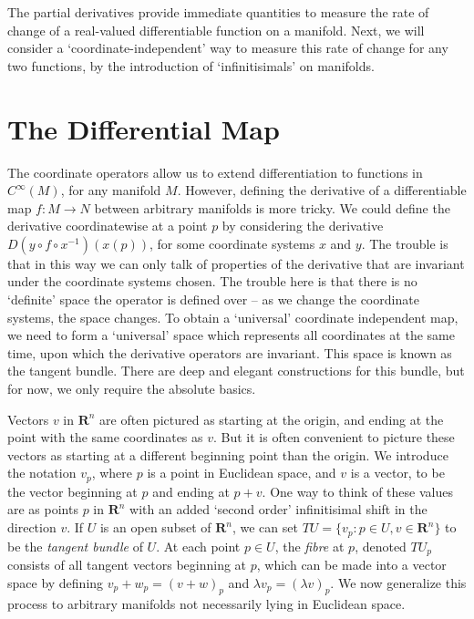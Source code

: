 The partial derivatives provide immediate quantities to measure the rate of change of a real-valued differentiable function on a manifold. Next, we will consider a `coordinate-independent' way to measure this rate of change for any two functions, by the introduction of `infinitisimals' on manifolds.

\section{The Differential Map}

The coordinate operators allow us to extend differentiation to functions in $C^\infty(M)$, for any manifold $M$. However, defining the derivative of a differentiable map $f: M \to N$ between arbitrary manifolds is more tricky. We could define the derivative coordinatewise at a point $p$ by considering the derivative $D(y \circ f \circ x^{-1})(x(p))$, for some coordinate systems $x$ and $y$. The trouble is that in this way we can only talk of properties of the derivative that are invariant under the coordinate systems chosen. The trouble here is that there is no `definite' space the operator is defined over -- as we change the coordinate systems, the space changes. To obtain a `universal' coordinate independent map, we need to form a `universal' space which represents all coordinates at the same time, upon which the derivative operators are invariant. This space is known as the tangent bundle. There are deep and elegant constructions for this bundle, but for now, we only require the absolute basics.

Vectors $v$ in $\mathbf{R}^n$ are often pictured as starting at the origin, and ending at the point with the same coordinates as $v$. But it is often convenient to picture these vectors as starting at a different beginning point than the origin. We introduce the notation $v_p$, where $p$ is a point in Euclidean space, and $v$ is a vector, to be the vector beginning at $p$ and ending at $p + v$. One way to think of these values are as points $p$ in $\mathbf{R}^n$ with an added `second order' infinitisimal shift in the direction $v$. If $U$ is an open subset of $\mathbf{R}^n$, we can set $TU = \{ v_p : p \in U, v \in \mathbf{R}^n \}$ to be the \emph{tangent bundle} of $U$. At each point $p \in U$, the \emph{fibre} at $p$, denoted $TU_p$ consists of all tangent vectors beginning at $p$, which can be made into a vector space by defining $v_p + w_p = (v + w)_p$ and $\lambda v_p = (\lambda v)_p$. We now generalize this process to arbitrary manifolds not necessarily lying in Euclidean space.

